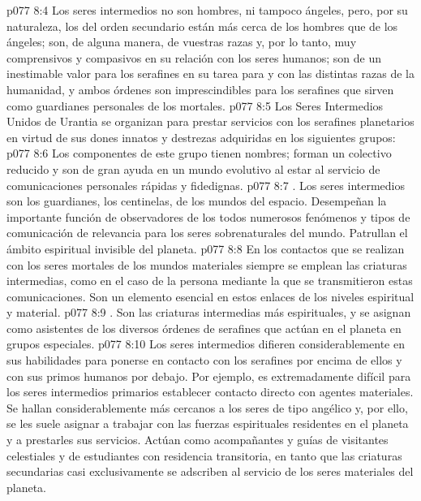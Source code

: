 \vs p077 8:4 Los seres intermedios no son hombres, ni tampoco ángeles, pero, por su naturaleza, los del orden secundario están más cerca de los hombres que de los ángeles; son, de alguna manera, de vuestras razas y, por lo tanto, muy comprensivos y compasivos en su relación con los seres humanos; son de un inestimable valor para los serafines en su tarea para y con las distintas razas de la humanidad, y ambos órdenes son imprescindibles para los serafines que sirven como guardianes personales de los mortales.
\vs p077 8:5 \pc Los Seres Intermedios Unidos de Urantia se organizan para prestar servicios con los serafines planetarios en virtud de sus dones innatos y destrezas adquiridas en los siguientes grupos:
\vs p077 8:6  Los componentes de este grupo tienen nombres; forman un colectivo reducido y son de gran ayuda en un mundo evolutivo al estar al servicio de comunicaciones personales rápidas y fidedignas.
\vs p077 8:7 . Los seres intermedios son los guardianes, los centinelas, de los mundos del espacio. Desempeñan la importante función de observadores de los todos numerosos fenómenos y tipos de comunicación de relevancia para los seres sobrenaturales del mundo. Patrullan el ámbito espiritual invisible del planeta.
\vs p077 8:8  En los contactos que se realizan con los seres mortales de los mundos materiales siempre se emplean las criaturas intermedias, como en el caso de la persona mediante la que se transmitieron estas comunicaciones. Son un elemento esencial en estos enlaces de los niveles espiritual y material.
\vs p077 8:9 . Son las criaturas intermedias más espirituales, y se asignan como asistentes de los diversos órdenes de serafines que actúan en el planeta en grupos especiales.
\vs p077 8:10 \pc Los seres intermedios difieren considerablemente en sus habilidades para ponerse en contacto con los serafines por encima de ellos y con sus primos humanos por debajo. Por ejemplo, es extremadamente difícil para los seres intermedios primarios establecer contacto directo con agentes materiales. Se hallan considerablemente más cercanos a los seres de tipo angélico y, por ello, se les suele asignar a trabajar con las fuerzas espirituales residentes en el planeta y a prestarles sus servicios. Actúan como acompañantes y guías de visitantes celestiales y de estudiantes con residencia transitoria, en tanto que las criaturas secundarias casi exclusivamente se adscriben al servicio de los seres materiales del planeta.

